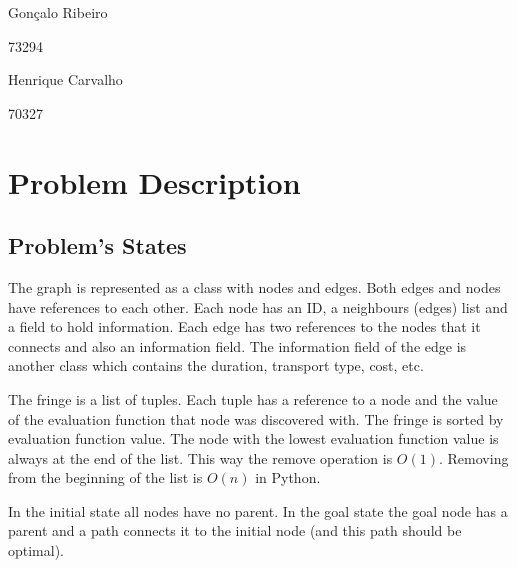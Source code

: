 \documentclass[a4paper]{article}
\begin{document}
	\trSetAuthors
	{
		\begin{center}
			Gonçalo Ribeiro

			73294
		\end{center}
	}{
		\begin{center}
			Henrique Carvalho

			70327
		\end{center}
	}

	\trMakeCover


	\setcounter{page}{1}

	\section{Problem Description}
    
    \subsection{Problem's States}
     
    The graph is represented as a class with nodes and edges. Both edges and nodes have references to each other. Each node has an ID, a neighbours (edges) list and a field to hold information. Each edge has two references to the nodes that it connects and also an information field. The information field of the edge is another class which contains the duration, transport type, cost, etc.
    
    The fringe is a list of tuples. Each tuple has a reference to a node and the value of the evaluation function that node was discovered with. The fringe is sorted by evaluation function value. The node with the lowest evaluation function value is always at the end of the list. This way the remove operation is $O(1)$. Removing from the beginning of the list is $O(n)$ in Python.
    
    In the initial state all nodes have no parent. In the goal state the goal node has a parent and a path connects it to the initial node (and this path should be optimal).
 
\end{document}

